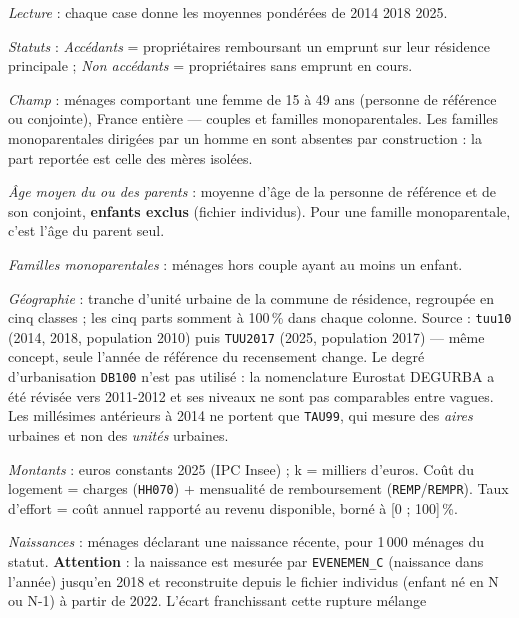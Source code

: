 \documentclass[12pt,a4paper]{article}
\begin{document}
\begin{table}[h!]
\begin{threeparttable}
		\begin{tablenotes}[flushleft]\scriptsize
			\item \textit{Lecture} : chaque case donne les moyennes pondérées de \textcolor{srcv1}{2014}\,\textbar\,\textcolor{srcv2}{2018}\,\textbar\,\textcolor{srcv3}{2025}.
			\item \textit{Statuts} : \textit{Accédants} = propriétaires remboursant un emprunt sur
			leur résidence principale ; \textit{Non accédants} = propriétaires sans emprunt en cours.
			\item \textit{Champ} : ménages comportant une femme de 15 à 49      ans (personne de référence ou conjointe), France entière --- couples et familles
			monoparentales. Les familles monoparentales dirigées par un homme en sont absentes
			par construction : la part reportée est celle des mères isolées.
			\item \textit{Âge moyen du ou des parents} : moyenne d'âge de la personne de référence
			et de son conjoint, \textbf{enfants exclus} (fichier individus). Pour une famille
			monoparentale, c'est l'âge du parent seul.
			\item \textit{Familles monoparentales} : ménages hors couple ayant au moins un enfant.
			\item \textit{Géographie} : tranche d'unité urbaine de la commune de résidence, regroupée
			en cinq classes ; les cinq parts somment à 100\,\% dans chaque colonne. Source :
			\texttt{tuu10} (2014, 2018, population 2010) puis \texttt{TUU2017} (2025, population
			2017) --- même concept, seule l'année de référence du recensement change.
			Le degré d'urbanisation \texttt{DB100} n'est pas utilisé : la nomenclature Eurostat
			DEGURBA a été révisée vers 2011-2012 et ses niveaux ne sont pas comparables entre
			vagues. Les millésimes antérieurs à 2014 ne portent que \texttt{TAU99}, qui mesure des
			\textit{aires} urbaines et non des \textit{unités} urbaines.
			\item \textit{Montants} : euros constants 2025 (IPC Insee) ; k\texteuro{} = milliers d'euros.
			Coût du logement =
			charges (\texttt{HH070}) + mensualité de remboursement (\texttt{REMP}/\texttt{REMPR}).
			Taux d'effort = coût annuel rapporté au revenu disponible, borné à [0 ; 100]\,\%.
			\item \textit{Naissances} : ménages déclarant une naissance récente, pour 1\,000
			ménages du statut. \textbf{Attention} : la naissance est mesurée par \texttt{EVENEMEN\_C}
			(naissance dans l'année) jusqu'en 2018 et reconstruite depuis le fichier individus
			(enfant né en N ou N-1) à partir de 2022. L'écart franchissant cette rupture mélange

\end{tablenotes}
\end{threeparttable}
\end{table}
\end{document}
